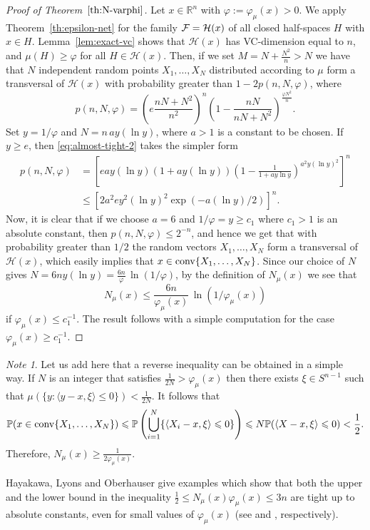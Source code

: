 \documentclass[11pt,leqno]{article}
\theoremstyle{definition}
\theoremstyle{remark}
\newtheorem*{note*}{Note}
\numberwithin{equation}{section}
\newcommand{\ls}{\leqslant}
\newcommand{\gr}{\geqslant}
\newcommand{\1}{\textbf{1}}
\begin{document}
\begin{proof}[Proof of Theorem~$\ref{th:N-varphi}$]
Let $x\in\mathbb{R}^n$ with $\varphi:=\varphi_{\mu}(x)>0$. We apply Theorem~\ref{th:epsilon-net} for the
family ${\cal F}=\mathcal{H}(x)$ of all closed half-spaces $H$ with $x\in H$. Lemma~\ref{lem:exact-vc}
shows that $\mathcal{H}(x)$ has VC-dimension equal to $n$, and $\mu (H)\gr\varphi $ for all $H\in \mathcal{H}(x)$. Then, if we set
$M=N+\frac{N^2}{n}>N$ we have that $N$ independent random points $X_1,\ldots ,X_N$ distributed according to $\mu $ form a transversal of $\mathcal{H}(x)$ with probability greater than $1-2p(n,N,\varphi)$, where
\begin{equation}\label{eq:almost-tight-2}p(n,N,\varphi)=\left(e\frac{nN+N^2}{n^2}\right)^{n}
\left(1-\frac{nN}{nN+N^2}\right)^{\frac{\varphi N^2}{n}}.\end{equation}
Set $y=1/\varphi $ and $N=n\,ay(\ln y)$, where $a>1$ is a constant to be chosen. If $y\gr e$, then
\eqref{eq:almost-tight-2} takes the simpler form
\begin{align*}p(n,N,\varphi)&=\left[eay(\ln y)(1+ay(\ln y))\left(1-\frac{1}{1+ay\ln y}\right)^{a^2y(\ln y)^2}\right]^{n}\\
&\ls \left[2a^2ey^2(\ln y)^2\exp\left(-a(\ln y)/2\right)\right]^{n}.\end{align*}
Now, it is clear that if we choose $a=6$ and $1/\varphi =y\gr c_1$ where $c_1>1$ is an absolute constant, then
$p(n,N,\varphi )\ls 2^{-n}$, and hence we get that with probability greater than $1/2$ the random
vectors $X_1,\ldots ,X_N$ form a transversal of $\mathcal{H}(x)$, which easily implies that $x\in {\rm conv}\{X_1,\ldots ,X_N\}$.
Since our choice of $N$ gives $N=6ny(\ln y)=\frac{6n}{\varphi}\,\ln (1/\varphi)$, by the definition of $N_{\mu}(x)$
we see that
$$N_{\mu}(x)\ls\frac{6n}{\varphi_{\mu}(x)}\,\ln\left(1/\varphi_{\mu}(x)\right)$$
if $\varphi_{\mu}(x)\ls c_1^{-1}$. The result follows with a simple computation for the case
$\varphi_{\mu}(x)\gr c_1^{-1}$.
\end{proof}



\begin{note*}Let us add here that a reverse inequality can be obtained in a simple way. If $N$ is an integer
that satisfies $\frac{1}{2N}>\varphi_{\mu}(x)$ then there exists $\xi\in S^{n-1}$ such that
$\mu(\{y:\langle y-x,\xi\rangle\ls 0\})<\frac{1}{2N}$. It follows that
$$\mathbb{P}(x\in {\rm conv}\{X_1,\ldots ,X_N\})\ls \mathbb{P}\left(\bigcup_{i=1}^N
\{\langle X_i-x,\xi\rangle\ls 0\}\right)\ls N\mathbb{P}(\langle X-x,\xi\rangle\ls 0)<\frac{1}{2}.$$
Therefore, $N_{\mu}(x)\gr\frac{1}{2\varphi_{\mu}(x)}$.

Hayakawa, Lyons and Oberhauser give examples which show that both the upper and the lower bound
in the inequality $\frac{1}{2}\ls N_{\mu}(x)\varphi_{\mu}(x)\ls 3n$ are tight up to absolute constants, even for
small values of $\varphi_{\mu}(x)$ (see \cite[Remark~4]{HLO-2023} and \cite[Example~35]{HLO-2023}, respectively).
\end{note*}
\end{document}
